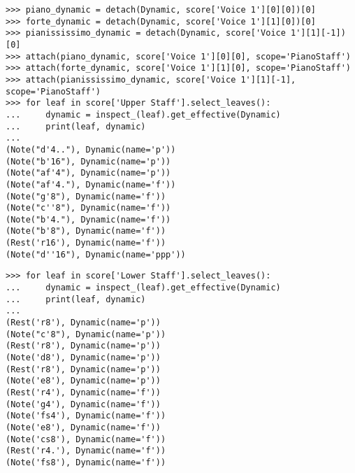 \begin{comment}
<abjad>
piano_dynamic = detach(Dynamic, score['Voice 1'][0][0])[0]
forte_dynamic = detach(Dynamic, score['Voice 1'][1][0])[0]
pianississimo_dynamic = detach(Dynamic, score['Voice 1'][1][-1])[0]
attach(piano_dynamic, score['Voice 1'][0][0], scope='PianoStaff')
attach(forte_dynamic, score['Voice 1'][1][0], scope='PianoStaff')
attach(pianississimo_dynamic, score['Voice 1'][1][-1], scope='PianoStaff')
for leaf in score['Upper Staff'].select_leaves():
    dynamic = inspect_(leaf).get_effective(Dynamic)
    print(leaf, dynamic)

for leaf in score['Lower Staff'].select_leaves():
    dynamic = inspect_(leaf).get_effective(Dynamic)
    print(leaf, dynamic)

</abjad>
\end{comment}

\begin{abjadbookoutput}
\begin{singlespacing}
\vspace{-0.5\baselineskip}
\begin{verbatim}
>>> piano_dynamic = detach(Dynamic, score['Voice 1'][0][0])[0]
>>> forte_dynamic = detach(Dynamic, score['Voice 1'][1][0])[0]
>>> pianississimo_dynamic = detach(Dynamic, score['Voice 1'][1][-1])[0]
>>> attach(piano_dynamic, score['Voice 1'][0][0], scope='PianoStaff')
>>> attach(forte_dynamic, score['Voice 1'][1][0], scope='PianoStaff')
>>> attach(pianississimo_dynamic, score['Voice 1'][1][-1], scope='PianoStaff')
>>> for leaf in score['Upper Staff'].select_leaves():
...     dynamic = inspect_(leaf).get_effective(Dynamic)
...     print(leaf, dynamic)
...
(Note("d'4.."), Dynamic(name='p'))
(Note("b'16"), Dynamic(name='p'))
(Note("af'4"), Dynamic(name='p'))
(Note("af'4."), Dynamic(name='f'))
(Note("g'8"), Dynamic(name='f'))
(Note("c''8"), Dynamic(name='f'))
(Note("b'4."), Dynamic(name='f'))
(Note("b'8"), Dynamic(name='f'))
(Rest('r16'), Dynamic(name='f'))
(Note("d''16"), Dynamic(name='ppp'))
\end{verbatim}
\begin{verbatim}
>>> for leaf in score['Lower Staff'].select_leaves():
...     dynamic = inspect_(leaf).get_effective(Dynamic)
...     print(leaf, dynamic)
...
(Rest('r8'), Dynamic(name='p'))
(Note("c'8"), Dynamic(name='p'))
(Rest('r8'), Dynamic(name='p'))
(Note('d8'), Dynamic(name='p'))
(Rest('r8'), Dynamic(name='p'))
(Note('e8'), Dynamic(name='p'))
(Rest('r4'), Dynamic(name='f'))
(Note('g4'), Dynamic(name='f'))
(Note('fs4'), Dynamic(name='f'))
(Note('e8'), Dynamic(name='f'))
(Note('cs8'), Dynamic(name='f'))
(Rest('r4.'), Dynamic(name='f'))
(Note('fs8'), Dynamic(name='f'))
\end{verbatim}
\end{singlespacing}
\end{abjadbookoutput}


